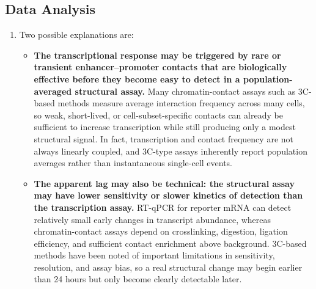 \documentclass[12pt,a4paper]{article}
\begin{document}
\subsection{Data Analysis}
\begin{enumerate}[parsep=0.5\baselineskip]
  \item Two possible explanations are:
  \begin{itemize}
    \item \textbf{The transcriptional response may be triggered by rare or transient enhancer–promoter contacts that are biologically effective before they become easy to detect in a population-averaged structural assay.} Many chromatin-contact assays such as 3C-based methods measure average interaction frequency across many cells, so weak, short-lived, or cell-subset-specific contacts can already be sufficient to increase transcription while still producing only a modest structural signal. In fact, transcription and contact frequency are not always linearly coupled, and 3C-type assays inherently report population averages rather than instantaneous single-cell events.
    \item \textbf{The apparent lag may also be technical: the structural assay may have lower sensitivity or slower kinetics of detection than the transcription assay.} RT-qPCR for reporter mRNA can detect relatively small early changes in transcript abundance, whereas chromatin-contact assays depend on crosslinking, digestion, ligation efficiency, and sufficient contact enrichment above background. 3C-based methods have been noted of important limitations in sensitivity, resolution, and assay bias, so a real structural change may begin earlier than 24 hours but only become clearly detectable later. 
  \end{itemize}
\end{enumerate}
\end{document}
